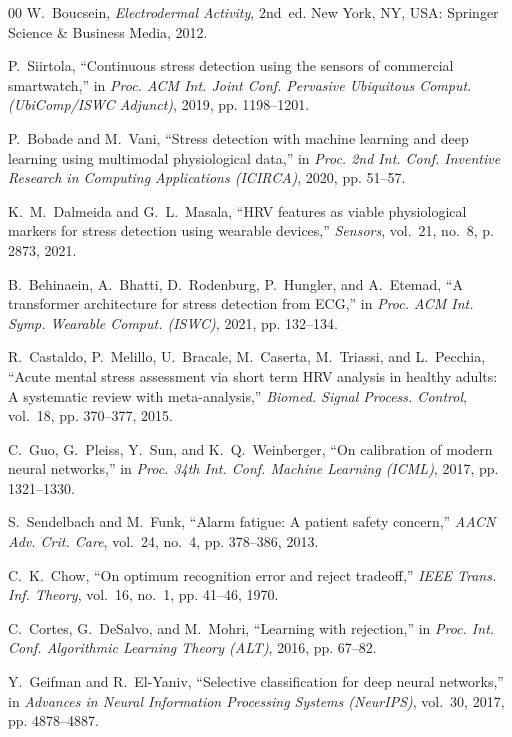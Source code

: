 \documentclass[conference]{IEEEtran}
\begin{document}
\begin{thebibliography}{00}
W.~Boucsein, \textit{Electrodermal Activity}, 2nd~ed. New York, NY, USA: Springer Science \& Business Media, 2012.

P.~Siirtola, ``Continuous stress detection using the sensors of commercial smartwatch,'' in \textit{Proc. ACM Int. Joint Conf. Pervasive Ubiquitous Comput. (UbiComp/ISWC Adjunct)}, 2019, pp. 1198--1201.

P.~Bobade and M.~Vani, ``Stress detection with machine learning and deep learning using multimodal physiological data,'' in \textit{Proc. 2nd Int. Conf. Inventive Research in Computing Applications (ICIRCA)}, 2020, pp. 51--57.

K.~M.~Dalmeida and G.~L.~Masala, ``HRV features as viable physiological markers for stress detection using wearable devices,'' \textit{Sensors}, vol.~21, no.~8, p. 2873, 2021.

B.~Behinaein, A.~Bhatti, D.~Rodenburg, P.~Hungler, and A.~Etemad, ``A transformer architecture for stress detection from ECG,'' in \textit{Proc. ACM Int. Symp. Wearable Comput. (ISWC)}, 2021, pp. 132--134.

R.~Castaldo, P.~Melillo, U.~Bracale, M.~Caserta, M.~Triassi, and L.~Pecchia, ``Acute mental stress assessment via short term HRV analysis in healthy adults: A systematic review with meta-analysis,'' \textit{Biomed. Signal Process. Control}, vol.~18, pp. 370--377, 2015.

C.~Guo, G.~Pleiss, Y.~Sun, and K.~Q.~Weinberger, ``On calibration of modern neural networks,'' in \textit{Proc. 34th Int. Conf. Machine Learning (ICML)}, 2017, pp. 1321--1330.

S.~Sendelbach and M.~Funk, ``Alarm fatigue: A patient safety concern,'' \textit{AACN Adv. Crit. Care}, vol.~24, no.~4, pp. 378--386, 2013.

C.~K.~Chow, ``On optimum recognition error and reject tradeoff,'' \textit{IEEE Trans. Inf. Theory}, vol.~16, no.~1, pp. 41--46, 1970.

C.~Cortes, G.~DeSalvo, and M.~Mohri, ``Learning with rejection,'' in \textit{Proc. Int. Conf. Algorithmic Learning Theory (ALT)}, 2016, pp. 67--82.

Y.~Geifman and R.~El-Yaniv, ``Selective classification for deep neural networks,'' in \textit{Advances in Neural Information Processing Systems (NeurIPS)}, vol.~30, 2017, pp. 4878--4887.


\end{thebibliography}
\end{document}
